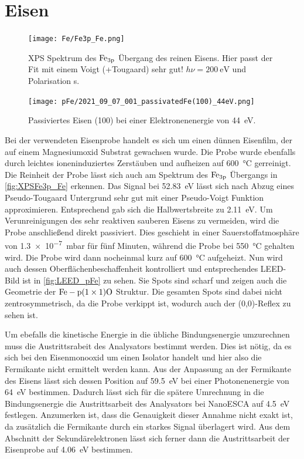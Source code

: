     \section{Eisen}
        \begin{figure}
            \centering
            \texttt{[image: Fe/Fe3p\_Fe.png]}
            \caption{XPS Spektrum des $\ce{Fe}_{3\text{p}}$ Übergang des reinen Eisens. Hier passt der Fit mit einem Voigt (+Tougaard) sehr gut! $h\nu = \SI{200}{\electronvolt}$ und Polarisation s.}
            \label{fig:XPSFe3p_Fe}
        \end{figure}
        \begin{figure}
            \centering
            \texttt{[image: pFe/2021\_09\_07\_001\_passivatedFe(100)\_44eV.png]}
            \caption{Passiviertes Eisen (100) bei einer Elektronenenergie von \SI{44}{\electronvolt}.}
            \label{fig:LEED_pFe}
        \end{figure}
        Bei der verwendeten Eisenprobe handelt es sich um einen dünnen Eisenfilm, der auf einem Magnesiumoxid Substrat gewachsen wurde.
        Die Probe wurde ebenfalls durch leichtes ioneninduziertes Zerstäuben und aufheizen auf \SI{600}{\celsius} gerreinigt.
        Die Reinheit der Probe lässt sich auch am Spektrum des $\ce{Fe}_{3\text{p}}$ Übergangs in \autoref{fig:XPSFe3p_Fe} erkennen.
        Das Signal bei \SI{52.83}{\electronvolt} lässt sich nach Abzug eines Pseudo-Tougaard Untergrund sehr gut mit einer Pseudo-Voigt Funktion approximieren.
        Entsprechend gab sich die Halbwertsbreite zu \SI{2.11}{\electronvolt}.
        Um Verunreinigungen des sehr reaktiven sauberen Eisens zu vermeiden, wird die Probe anschließend direkt passiviert.
        Dies geschieht in einer Sauerstoffatmosphäre von \SI{1.3e-7}{\milli\bar} für fünf Minuten, während die Probe bei \SI{550}{\celsius} gehalten wird.
        Die Probe wird dann nocheinmal kurz auf \SI{600}{\celsius} aufgeheizt.
        Nun wird auch dessen Oberflächenbeschaffenheit kontrolliert und entsprechendes LEED-Bild ist in \autoref{fig:LEED_pFe} zu sehen.
        Sie Spots sind scharf und zeigen auch die Geometrie der $\ce{Fe}-\text{p}(1 \times 1)\ce{O}$ Struktur.
        Die gesamten Spots sind dabei nicht zentrosymmetrisch, da die Probe verkippt ist, wodurch auch der (0,0)-Reflex zu sehen ist.

        Um ebefalls die kinetische Energie in die übliche Bindungsenergie umzurechnen muss die Austrittsrabeit des Analysators bestimmt werden.
        Dies ist nötig, da es sich bei den Eisenmonooxid um einen Isolator handelt und hier also die Fermikante nicht ermittelt werden kann.
        Aus der Anpassung an der Fermikante des Eisens lässt sich dessen Position auf \SI{59.5}{\electronvolt} bei einer Photonenenergie von \SI{64}{\electronvolt} bestimmen.
        Dadurch lässt sich für die spätere Umrechnung in die Bindungsenergie die Austrittsarbeit des Analysators bei NanoESCA auf \SI{4.5}{\electronvolt} festlegen.
        Anzumerken ist, dass die Genauigkeit dieser Annahme nicht exakt ist, da zusätzlich die Fermikante durch ein starkes Signal überlagert wird.
        Aus dem Abschnitt der Sekundärelektronen lässt sich ferner dann die Austrittsarbeit der Eisenprobe auf \SI{4.06}{\electronvolt} bestimmen.
        
